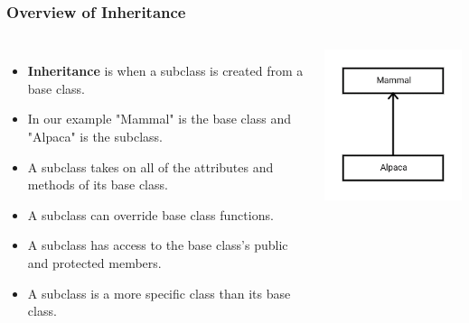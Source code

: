 \documentclass{beamer}
\begin{document}
\begin{frame}
    \frametitle{Overview of Inheritance}
    \begin{columns}
    \begin{itemize}
        \item<2-> {\bf Inheritance} is when a subclass is created
            from a base class.
        \item<3-> In our example "Mammal" is the base class and 
            "Alpaca" is the subclass.
        \item<4-> A subclass takes on all of the attributes and methods of
            its base class.
        \item<5-> A subclass can override base class functions.
        \item<6-> A subclass has access to the base class's public and 
            protected members.
        \item<7-> A subclass is a more specific class than its base class.
    \end{itemize}
    
    \includegraphics[width=\textwidth]{images/mammal}
    \end{columns}
\end{frame}
\end{document}
